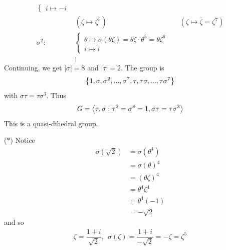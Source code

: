 \begin{example}
\begin{align*}
\begin{cases*}
            i \mapsto -i
        \end{cases*} \\
        &(\zeta \mapsto \zeta^5)
        &&(\zeta \mapsto \bar{\zeta} = \zeta^7)
        \tag{$*$} \\
        \sigma^2: &\begin{cases*}
            \theta \mapsto \sigma(\theta \zeta) = \theta \zeta \cdot \theta^5 = \theta \zeta^6 \\
            i \mapsto i
        \end{cases*} \\
        &\vdots
    \end{align*}
    Continuing, we get $|\sigma| = 8$ and $|\tau| = 2.$ The group is 
    $$\left\{1, \sigma, \sigma^2, ..., \sigma^7, \tau, \tau \sigma, ..., \tau \sigma^7\right\}$$
    with $\sigma \tau = \tau \sigma^3.$ Thus
    $$G = \left\langle \tau, \sigma : \tau^2 = \sigma^8 = 1, \sigma \tau = \tau \sigma^3 \right\rangle$$
    This is a quasi-dihedral group.

    ($*$) Notice 
    \begin{align*}
        \sigma(\sqrt{2}) &= \sigma(\theta^4) \\
        &= \sigma(\theta)^4 \\
        &= \left(\theta \zeta\right)^4 \\
        &= \theta^4 \zeta^4 \\
        &= \theta^4(-1) \\
        &= -\sqrt{2}
    \end{align*} and so 
    \begin{align*}
        \zeta = \dfrac{1+i}{\sqrt{2}}, ~~\sigma(\zeta) = \dfrac{1+i}{-\sqrt{2}} = -\zeta = \zeta^5
    \end{align*}
\end{example}